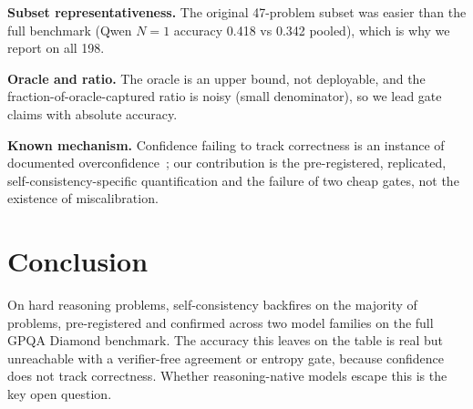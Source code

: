 \documentclass{article}
\begin{document}
\textbf{Subset representativeness.} The original 47-problem subset was easier
than the full benchmark (Qwen $N=1$ accuracy 0.418 vs 0.342 pooled), which is
why we report on all 198.

\textbf{Oracle and ratio.} The oracle is an upper bound, not deployable, and
the fraction-of-oracle-captured ratio is noisy (small denominator), so we lead
gate claims with absolute accuracy.

\textbf{Known mechanism.} Confidence failing to track correctness is an
instance of documented overconfidence~\citep{guo2017calibration,
kadavath2022language}; our contribution is the pre-registered, replicated,
self-consistency-specific quantification and the failure of two cheap gates,
not the existence of miscalibration.

\section{Conclusion}

On hard reasoning problems, self-consistency backfires on the majority of
problems, pre-registered and confirmed across two model families on the full
GPQA Diamond benchmark. The accuracy this leaves on the table is real but
unreachable with a verifier-free agreement or entropy gate, because confidence
does not track correctness. Whether reasoning-native models escape this is the
key open question.



\end{document}
